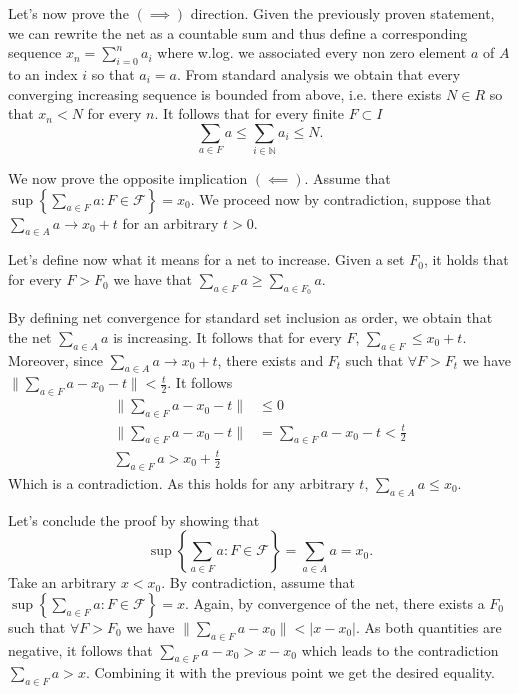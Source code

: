 \documentclass[a4paper,12pt]{article} %
\begin{document}
Let's now prove the \((\implies) \) direction.
Given the previously proven statement, we can rewrite the net as a countable sum and thus define a corresponding sequence \(x_n = \sum_{i=0}^n a_{i}  \) where w.log. we associated every non zero element \(a\)  of \(A\) to an index \(i\) so that \(a_i = a\).
From standard analysis we obtain that every converging increasing sequence is bounded from above, i.e. there exists \(N \in  R\) so that \(x_n < N\) for every \(n\).
It follows that for every finite \(F \subset I\)
\begin{equation}
    \sum_{a \in F} a \leq \sum_{i \in  \mathbb{N}}a_i \leq N.
\end{equation}


We now prove the opposite implication \((\impliedby)\). Assume that \(\sup \left\{ \sum_{a \in F} a : F \in \mathcal{F} \right\} = x_0\). We proceed now by contradiction, suppose that \(\sum_{a \in  A}a \to  x_0 +t \) for an arbitrary \(t>0\).


Let's define now what it means for a net to increase. Given a set \(F_0\), it holds that for every \(F > F_0\) we have that \(\sum_{a\in  F}a \geq  \sum_{a \in  F_0}a  \).

By defining net convergence for standard set inclusion as order, we obtain that the net \(\sum_{a\in  A}a \) is increasing.
It follows that for every \(F\), \(\sum_{a \in  F} \leq  x_0 +t \). Moreover, since \(\sum_{a \in  A} a \to x_{0}+t  \), there exists and \(F_t\)  such that \(\forall F > F_t\) we have \(\| \sum_{a \in  F} a -x_{0}-t   \| < \frac{t}{2} \). It follows
\begin{align*}
    \| \sum_{a \in  F} a -x_0 -t  \| & \leq 0                                   \\
    \| \sum_{a \in  F} a -x_0 -t  \| & =  \sum_{a \in  F} a -x_0 -t<\frac{t}{2} \\
    \sum_{a \in  F}a > x_0 +\frac{t}{2}
\end{align*}
Which is a contradiction. As this holds for any arbitrary \(t\), \(\sum_{a\in A}a \leq x_0 \).


Let's conclude the proof by showing that
\begin{equation}
    \sup \left\{ \sum_{a \in F} a : F \in \mathcal{F} \right\} = \sum_{a \in  A} a = x_0.
\end{equation}
Take an arbitrary \(x<x_0\). By contradiction, assume that \(\sup \left\{ \sum_{a \in F} a : F \in \mathcal{F} \right\} = x\).
Again, by convergence of the net, there exists a \(F_0\) such that \(\forall F>F_0\) we have \(    \| \sum_{a \in F}a -x_0  \|  <|x-x_0|\). As both quantities are negative, it follows that
\(    \sum_{a \in  F} a- x_0 > x-x_0\) which leads to the contradiction \(\sum_{a \in  F} a > x \).
Combining it with the previous point we get the desired equality.
\end{document}
